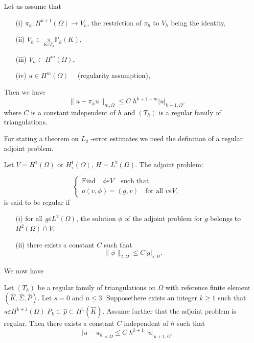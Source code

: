 \begin{THM}\label{chap5:THM6}
Let us assume that 

\begin{enumerate}
\item [(i)] $\pi_h:H^{k+1}(\Omega)\to V_h$, the restriction of $\pi_h$
  to $V_h$ being the identity,
\item [(ii)] $V_h\subset\underset{K\varepsilon
T_h}{\pi}\mathbb{P}_k(K)$,
\item [(iii)] $V_h\subset H^m(\Omega)$,\pageoriginale
\item [(iv)] $u\in H^m(\Omega)\quad$ (regularity assumption), 
\end{enumerate}
Then we have 
$$
\parallel u-\pi_hu\parallel_{m,\Omega}\leq
C\;h^{k+1-m}|u|_{k+1,\Omega},
$$
where $C$ is a constant independent of $h$ and $(T_h)$ is a regular
family of triangulations.
\end{THM}

For stating a theorem on $L_2$ -error estimates we need the definition
of a regular adjoint problem.

\begin{def*}
Let $V=H^1(\Omega)$ or $H_\circ^1(\Omega)$, $H=L^2(\Omega)$. The
adjoint problem:

\begin{equation*}
\begin{cases}
\text{Find}\quad\phi\varepsilon V\quad\text{such that}\\
a(v,\phi)= (g, v)\quad\text{for all } v\varepsilon V,
\end{cases}
\end{equation*}
is said to be regular if 

\begin{enumerate}
\item [(i)] for all $g\varepsilon L^2(\Omega)$, the solution $\phi$ of
the adjoint problem for $g$ belongs to $H^2(\Omega)\cap V$;
\item [(ii)] there exists a constant $C$ such that 
$$
\parallel\phi\parallel_{2,\Omega}\leq C|g|_{\circ,\Omega}.
$$
\end{enumerate}

We now have
\end{def*}

\begin{THM}\label{chap5:THM7}
Let $(T_h)$ be a regular family of triangulations on $\Omega$ with
reference finite element $(\hat{K},\hat{\Sigma},\hat{P})$. Let $s=0$
and $n\leq 3$. Suppose\pageoriginale there exists an integer $k\geq 1$
such that $u\varepsilon H^{k+1}(\Omega) \; P_k\subset\hat{p}\subset H^1
(\hat{K})$. Assume further that the adjoint problem is regular. Then
there exists a constant $C$ independent of $h$ such that 
$$
|u-u_h|_{\circ,\Omega}\leq C \;h^{k+1}\;|u|_{k+1,\Omega}.
$$
\end{THM}
